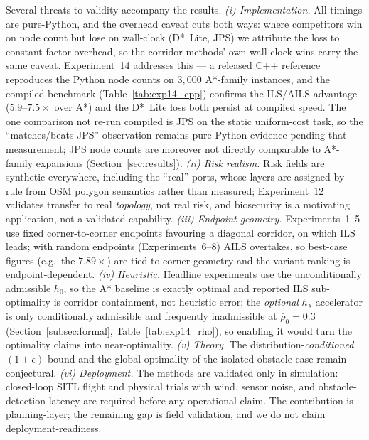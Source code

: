 \documentclass[preprint,12pt,authoryear]{elsarticle}
\begin{document}
Several threats to validity accompany the results. \emph{(i) Implementation.} All timings are pure-Python, and the overhead caveat cuts both ways: where competitors win on node count but lose on wall-clock (D*~Lite, JPS) we attribute the loss to constant-factor overhead, so the corridor methods' own wall-clock wins carry the same caveat. Experiment~14 addresses this --- a released C++ reference reproduces the Python node counts on $3{,}000$ A*-family instances, and the compiled benchmark (Table~\ref{tab:exp14_cpp}) confirms the ILS/AILS advantage ($5.9$--$7.5\times$ over A*) and the D*~Lite loss both persist at compiled speed. The one comparison not re-run compiled is JPS on the static uniform-cost task, so the ``matches/beats JPS'' observation remains pure-Python evidence pending that measurement; JPS node counts are moreover not directly comparable to A*-family expansions (Section~\ref{sec:results}). \emph{(ii) Risk realism.} Risk fields are synthetic everywhere, including the ``real'' ports, whose layers are assigned by rule from OSM polygon semantics rather than measured; Experiment~12 validates transfer to real \emph{topology}, not real risk, and biosecurity is a motivating application, not a validated capability. \emph{(iii) Endpoint geometry.} Experiments~1--5 use fixed corner-to-corner endpoints favouring a diagonal corridor, on which ILS leads; with random endpoints (Experiments~6--8) AILS overtakes, so best-case figures (e.g.\ the $7.89\times$) are tied to corner geometry and the variant ranking is endpoint-dependent. \emph{(iv) Heuristic.} Headline experiments use the unconditionally admissible $h_0$, so the A* baseline is exactly optimal and reported ILS sub-optimality is corridor containment, not heuristic error; the \emph{optional} $h_\lambda$ accelerator is only conditionally admissible and frequently inadmissible at $\bar{\rho}_0=0.3$ (Section~\ref{subsec:formal}, Table~\ref{tab:exp14_rho}), so enabling it would turn the optimality claims into near-optimality. \emph{(v) Theory.} The distribution-\emph{conditioned} $(1+\epsilon)$ bound and the global-optimality of the isolated-obstacle case remain conjectural. \emph{(vi) Deployment.} The methods are validated only in simulation: closed-loop SITL flight and physical trials with wind, sensor noise, and obstacle-detection latency are required before any operational claim. The contribution is planning-layer; the remaining gap is field validation, and we do not claim deployment-readiness.

\end{document}
